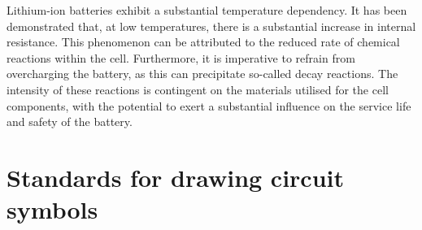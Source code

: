 Lithium-ion batteries exhibit a substantial temperature dependency. It has been demonstrated that, at low temperatures, there is a substantial increase in internal resistance. This phenomenon can be attributed to the reduced rate of chemical reactions within the cell. Furthermore, it is imperative to refrain from overcharging the battery, as this can precipitate so-called decay reactions. The intensity of these reactions is contingent on the materials utilised for the cell components, with the potential to exert a substantial influence on the service life and safety of the battery.\autocite[S. 15f.]{Korthauer.2013}


\section{Standards for drawing circuit symbols}

